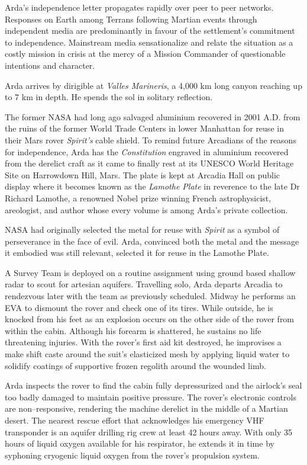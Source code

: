 Arda's independence letter propagates rapidly over peer to peer networks. Responses on Earth among Terrans following Martian events through independent media are predominantly in favour of the settlement's commitment to independence. Mainstream media sensationalize and relate the situation as a costly mission in crisis at the mercy of a Mission Commander of questionable intentions and character.
\StopTimelineDate

Arda arrives by dirigible at {\it Valles Marineris}, a 4,000 km long canyon reaching up to 7 km in depth. He spends the sol in solitary reflection.

The former NASA had long ago salvaged aluminium recovered in 2001 A.D. from the ruins of the former World Trade Centers in lower Manhattan for reuse in their Mars rover {\it Spirit's} cable shield. To remind future Arcadians of the reasons for independence, Arda has the {\it Constitution} engraved in aluminium recovered from the derelict craft as it came to finally rest at its UNESCO World Heritage Site on Harrowdown Hill, Mars. The plate is kept at Arcadia Hall on public display where it becomes known as the {\it Lamothe Plate} in reverence to the late Dr Richard Lamothe, a renowned Nobel prize winning French astrophysicist, areologist, and author whose every volume is among Arda's private collection.

NASA had originally selected the metal for reuse with {\it Spirit} as a symbol of perseverance in the face of evil. Arda, convinced both the metal and the message it embodied was still relevant, selected it for reuse in the Lamothe Plate.
\StopTimelineDate

A Survey Team is deployed on a routine assignment using ground based shallow radar to scout for artesian aquifers. Travelling solo, Arda departs Arcadia to rendezvous later with the team as previously scheduled. Midway he performs an EVA to dismount the rover and check one of its tires. While outside, he is knocked from his feet as an explosion occurs on the other side of the rover from within the cabin. Although his forearm is shattered, he sustains no life threatening injuries. With the rover's first aid kit destroyed, he improvises a make shift caste around the suit's elasticized mesh by applying liquid water to solidify coatings of supportive frozen regolith around the wounded limb.

Arda inspects the rover to find the cabin fully depressurized and the airlock's seal too badly damaged to maintain positive pressure. The rover's electronic controls are non--responsive, rendering the machine derelict in the middle of a Martian desert. The nearest rescue effort that acknowledges his emergency VHF transponder is an aquifer drilling rig crew at least 42 hours away. With only 35 hours of liquid oxygen available for his respirator, he extends it in time by syphoning cryogenic liquid oxygen from the rover's propulsion system.

